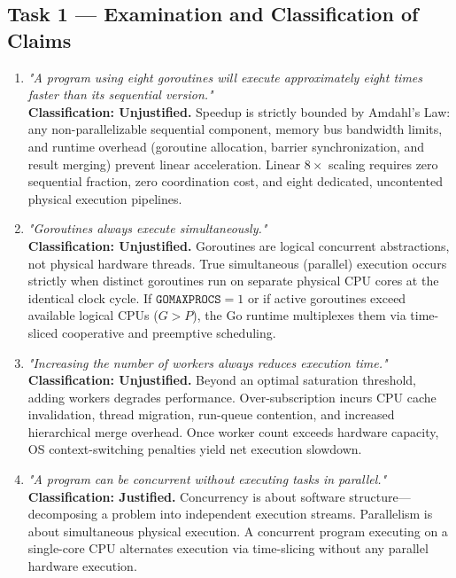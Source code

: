 \documentclass[11pt]{article}
\begin{document}
\subsection*{Task 1 --- Examination and Classification of Claims}
\begin{enumerate}[label=\textbf{Statement \arabic*:}, leftmargin=1.6em, itemsep=0.4em]
    \item \textit{"A program using eight goroutines will execute approximately eight times faster than its sequential version."}\\
    \textbf{Classification: Unjustified.} Speedup is strictly bounded by Amdahl's Law: any non-parallelizable sequential component, memory bus bandwidth limits, and runtime overhead (goroutine allocation, barrier synchronization, and result merging) prevent linear acceleration. Linear $8\times$ scaling requires zero sequential fraction, zero coordination cost, and eight dedicated, uncontented physical execution pipelines.

    \item \textit{"Goroutines always execute simultaneously."}\\
    \textbf{Classification: Unjustified.} Goroutines are logical concurrent abstractions, not physical hardware threads. True simultaneous (parallel) execution occurs strictly when distinct goroutines run on separate physical CPU cores at the identical clock cycle. If $\texttt{GOMAXPROCS} = 1$ or if active goroutines exceed available logical CPUs ($G > P$), the Go runtime multiplexes them via time-sliced cooperative and preemptive scheduling.

    \item \textit{"Increasing the number of workers always reduces execution time."}\\
    \textbf{Classification: Unjustified.} Beyond an optimal saturation threshold, adding workers degrades performance. Over-subscription incurs CPU cache invalidation, thread migration, run-queue contention, and increased hierarchical merge overhead. Once worker count exceeds hardware capacity, OS context-switching penalties yield net execution slowdown.

    \item \textit{"A program can be concurrent without executing tasks in parallel."}\\
    \textbf{Classification: Justified.} Concurrency is about software structure---decomposing a problem into independent execution streams. Parallelism is about simultaneous physical execution. A concurrent program executing on a single-core CPU alternates execution via time-slicing without any parallel hardware execution.


\end{enumerate}
\end{document}

